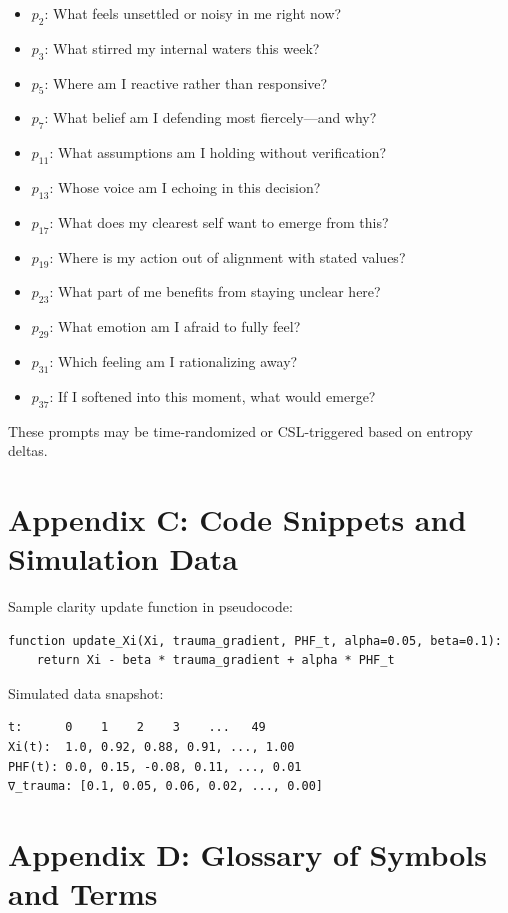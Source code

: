 \documentclass[12pt]{article}
\begin{document}
\begin{itemize}
  \item $p_2$: What feels unsettled or noisy in me right now?
  \item $p_3$: What stirred my internal waters this week?
  \item $p_5$: Where am I reactive rather than responsive?
  \item $p_7$: What belief am I defending most fiercely—and why?
  \item $p_{11}$: What assumptions am I holding without verification?
  \item $p_{13}$: Whose voice am I echoing in this decision?
  \item $p_{17}$: What does my clearest self want to emerge from this?
  \item $p_{19}$: Where is my action out of alignment with stated values?
  \item $p_{23}$: What part of me benefits from staying unclear here?
  \item $p_{29}$: What emotion am I afraid to fully feel?
  \item $p_{31}$: Which feeling am I rationalizing away?
  \item $p_{37}$: If I softened into this moment, what would emerge?
\end{itemize}

These prompts may be time-randomized or CSL-triggered based on entropy deltas.

\section{Appendix C: Code Snippets and Simulation Data}

Sample clarity update function in pseudocode:

\begin{verbatim}
function update_Xi(Xi, trauma_gradient, PHF_t, alpha=0.05, beta=0.1):
    return Xi - beta * trauma_gradient + alpha * PHF_t
\end{verbatim}

Simulated data snapshot:

\begin{verbatim}
t:      0    1    2    3    ...   49
Xi(t):  1.0, 0.92, 0.88, 0.91, ..., 1.00
PHF(t): 0.0, 0.15, -0.08, 0.11, ..., 0.01
∇_trauma: [0.1, 0.05, 0.06, 0.02, ..., 0.00]
\end{verbatim}

\section{Appendix D: Glossary of Symbols and Terms}
\end{document}
